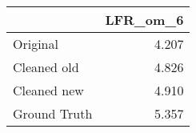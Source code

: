 \begin{tabular}{lr}
\toprule
{} & LFR_om_6 \\
\midrule
Original     &    4.207 \\
Cleaned old  &    4.826 \\
Cleaned new  &    4.910 \\
Ground Truth &    5.357 \\
\bottomrule
\end{tabular}
